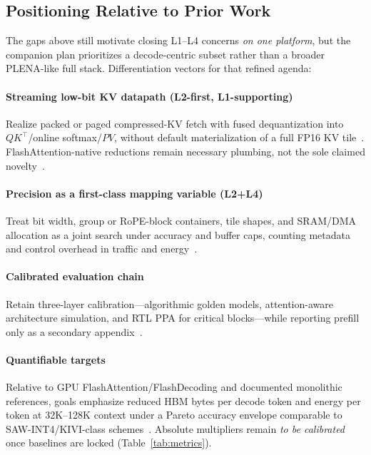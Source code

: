 \documentclass[conference]{IEEEtran}
\begin{document}
\subsection{Positioning Relative to Prior Work}
\label{sec:gaps-positioning}

The gaps above still motivate closing L1--L4 concerns \emph{on one platform}, but the companion plan prioritizes a decode-centric subset rather than a broader PLENA-like full stack.
Differentiation vectors for that refined agenda:

\paragraph{Streaming low-bit KV datapath (L2-first, L1-supporting)}
Realize packed or paged compressed-KV fetch with fused dequantization into $QK^\top$/online softmax/$PV$, without default materialization of a full FP16 KV tile~\cite{bitdecoding2026,sawint42026,liu2024kivi}.
FlashAttention-native reductions remain necessary plumbing, not the sole claimed novelty~\cite{lin2025systolicattention,plena2025}.

\paragraph{Precision as a first-class mapping variable (L2+L4)}
Treat bit width, group or RoPE-block containers, tile shapes, and SRAM/DMA allocation as a joint search under accuracy and buffer caps, counting metadata and control overhead in traffic and energy~\cite{plena2025,batquant2026,sawint42026}.

\paragraph{Calibrated evaluation chain}
Retain three-layer calibration---algorithmic golden models, attention-aware architecture simulation, and RTL PPA for critical blocks---while reporting prefill only as a secondary appendix~\cite{parashar2019timeloop,scalesimv3_2025,klhufek2025transinfersim,lin2025systolicattention}.

\paragraph{Quantifiable targets}
Relative to GPU FlashAttention/FlashDecoding and documented monolithic references, goals emphasize reduced HBM bytes per decode token and energy per token at 32K--128K context under a Pareto accuracy envelope comparable to SAW-INT4/KIVI-class schemes~\cite{sawint42026,liu2024kivi,dao2023flashdecoding}.
Absolute multipliers remain \emph{to be calibrated} once baselines are locked (Table~\ref{tab:metrics}).
\end{document}
